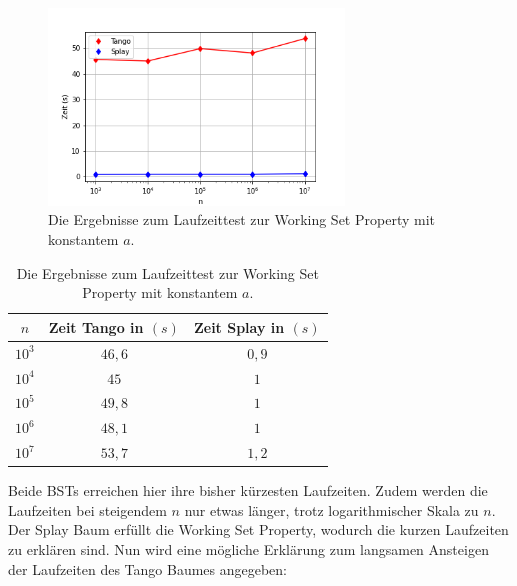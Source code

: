 \documentclass[a4paper,12pt]{article}
\begin{document}
\begin{figure}[H]
	\centering
	\includegraphics[width=0.7\textwidth]{Medien/laufzeittest/diagramm/workingset}
	\caption{Die Ergebnisse zum Laufzeittest zur Working Set Property mit konstantem $a$.}
\end{figure}
\begin{table}[H]
	\begin{center}
		\begin{tabular}[c]{|c|c|c|}
			\hline
			$n$ & Zeit Tango in $\left(s\right)$ &Zeit Splay in $\left(s\right)$ \\
			\hline
			$10^3$ & $46,6$ &$0,9$ \\
			\hline
			$10^4$  & $45$ &$1$  \\
			\hline
			$10^5$  & $49,8$ &$1$  \\
			\hline
			$10^6$  & $48,1$ &$1$  \\
			\hline
			$10^7$  & $53,7$ &$1,2$  \\
			\hline
		\end{tabular}
		\caption{Die Ergebnisse zum Laufzeittest zur Working Set Property mit konstantem $a$.} 
	\end{center}
\end{table}
\noindent Beide BSTs erreichen hier ihre bisher kürzesten Laufzeiten. Zudem werden die Laufzeiten  bei steigendem $n$ nur etwas länger, trotz logarithmischer Skala zu $n$. Der Splay Baum erfüllt die Working Set Property, wodurch die kurzen Laufzeiten zu erklären sind. Nun wird eine mögliche Erklärung zum langsamen Ansteigen der Laufzeiten des Tango Baumes angegeben: \\
\end{document}
